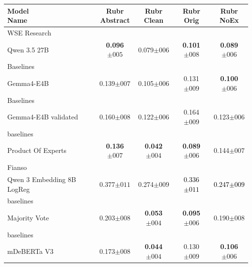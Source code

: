 \begin{tabularx}{\textwidth}{X | c c c c}
\hline
\makecell[b]{\textbf{Model} \\ \textbf{Name}} & \makecell[b]{\textbf{Rubr} \\ \textbf{Abstract}} & \makecell[b]{\textbf{Rubr} \\ \textbf{Clean}} & \makecell[b]{\textbf{Rubr} \\ \textbf{Orig}} & \makecell[b]{\textbf{Rubr} \\ \textbf{NoEx}} \\
\hline
WSE Research\\\subcatarrow{}Qwen 3.5 27B & \textbf{\textcolor{BrickRed}{0.096$\pm{}005$}} & \textcolor{BrickRed}{0.079$\pm{}006$} & \textbf{\textcolor{BrickRed}{0.101$\pm{}008$}} & \textbf{\textcolor{BrickRed}{0.089$\pm{}006$}} \\
Baselines\\\subcatarrow{}Gemma4-E4B & \textcolor{BrickRed}{0.139$\pm{}007$} & \textcolor{White!50!BrickRed}{0.105$\pm{}006$} & \textcolor{BrickRed}{0.131$\pm{}009$} & \textbf{\textcolor{BrickRed}{0.100$\pm{}006$}} \\
Baselines\\\subcatarrow{}Gemma4-E4B validated & \textcolor{White!50!BrickRed}{0.160$\pm{}008$} & \textcolor{White!50!BrickRed}{0.122$\pm{}006$} & \textcolor{White!50!BrickRed}{0.164$\pm{}009$} & \textcolor{BrickRed}{0.123$\pm{}006$} \\
baselines\\\subcatarrow{}Product Of Experts & \textbf{\textcolor{BrickRed}{0.136$\pm{}007$}} & \textbf{\textcolor{BrickRed}{0.042$\pm{}004$}} & \textbf{\textcolor{BrickRed}{0.089$\pm{}006$}} & \textcolor{White!50!BrickRed}{0.144$\pm{}007$} \\
Fianso\\\subcatarrow{}Qwen 3 Embedding 8B LogReg & \textcolor{White!50!NavyBlue}{0.377$\pm{}011$} & \textcolor{White!50!NavyBlue}{0.274$\pm{}009$} & \textcolor{Black}{0.336$\pm{}011$} & \textcolor{Black}{0.247$\pm{}009$} \\
baselines\\\subcatarrow{}Majority Vote & \textcolor{White!50!BrickRed}{0.203$\pm{}008$} & \textbf{\textcolor{BrickRed}{0.053$\pm{}004$}} & \textbf{\textcolor{BrickRed}{0.095$\pm{}006$}} & \textcolor{White!50!BrickRed}{0.190$\pm{}008$} \\
baselines\\\subcatarrow{}mDeBERTa V3 & \textcolor{White!50!BrickRed}{0.173$\pm{}008$} & \textbf{\textcolor{BrickRed}{0.044$\pm{}004$}} & \textcolor{BrickRed}{0.130$\pm{}009$} & \textbf{\textcolor{BrickRed}{0.106$\pm{}006$}} \\

\end{tabularx}
